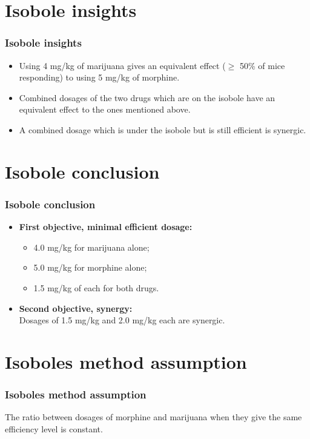 \documentclass[14pt]{beamer}
\begin{document}
\section{Isobole insights}
\begin{frame}
\frametitle{Isobole insights}
\begin{itemize}[label={$\blacktriangleright$}]
\item Using 4 mg/kg of marijuana gives an equivalent effect ($\geq$ 50\% of mice responding) to using 5 mg/kg of morphine.
\item Combined dosages of the two drugs which are on the isobole have an equivalent effect to the ones mentioned above.
\item A combined dosage which is under the isobole but is still efficient is synergic.
\end{itemize}
\end{frame}

\section{Isobole conclusion}
\begin{frame}
\frametitle{Isobole conclusion}
\begin{itemize}[label={\checkmark}]
\item \textbf{First objective, minimal efficient dosage:} \\
\begin{itemize}[label={$\blacktriangleright$}]
\item 4.0 mg/kg for marijuana alone;
\item 5.0 mg/kg for morphine alone;
\item 1.5 mg/kg of each for both drugs.
\end{itemize}
\item \textbf{Second objective, synergy:} \\
Dosages of 1.5 mg/kg and 2.0 mg/kg each are synergic.
\end{itemize}
\end{frame}

\section{Isoboles method assumption}
\begin{frame}
\frametitle{Isoboles method assumption}
The ratio between dosages of morphine and marijuana when they give the same efficiency level is constant.
\end{frame}
\end{document}

